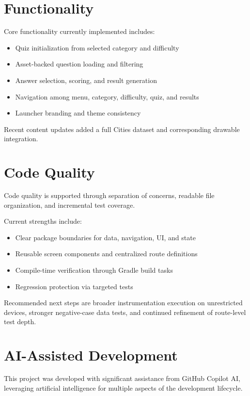 \documentclass[12pt,a4paper]{article}
\begin{document}
\section{Functionality}
Core functionality currently implemented includes:
\begin{itemize}
    \item Quiz initialization from selected category and difficulty
    \item Asset-backed question loading and filtering
    \item Answer selection, scoring, and result generation
    \item Navigation among menu, category, difficulty, quiz, and results
    \item Launcher branding and theme consistency
\end{itemize}

Recent content updates added a full Cities dataset and corresponding drawable integration.

\section{Code Quality}
Code quality is supported through separation of concerns, readable file organization, and incremental test coverage.

Current strengths include:
\begin{itemize}
    \item Clear package boundaries for data, navigation, UI, and state
    \item Reusable screen components and centralized route definitions
    \item Compile-time verification through Gradle build tasks
    \item Regression protection via targeted tests
\end{itemize}

Recommended next steps are broader instrumentation execution on unrestricted devices, stronger negative-case data tests, and continued refinement of route-level test depth.

\section{AI-Assisted Development}

This project was developed with significant assistance from GitHub Copilot AI, leveraging artificial intelligence for multiple aspects of the development lifecycle.
\end{document}
